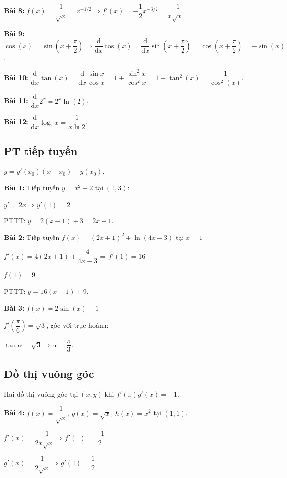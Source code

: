 \documentclass[12pt,a4paper]{article}
\begin{document}
\textbf{Bài 8:} $f(x) = \dfrac{1}{\sqrt{x}} = x^{-1/2} \Rightarrow f'(x) = -\dfrac{1}{2}x^{-3/2} = \dfrac{-1}{x\sqrt{x}}$.

\textbf{Bài 9:} $\cos(x) = \sin(x+\dfrac{\pi}{2}) \Rightarrow \dfrac{\mathrm{d}}{\mathrm{d}x}\cos(x) = \dfrac{\mathrm{d}}{\mathrm{d}x}\sin(x+\dfrac{\pi}{2}) = \cos(x+\dfrac{\pi}{2}) = -\sin(x)$.

\textbf{Bài 10:} $\dfrac{\mathrm{d}}{\mathrm{d}x}\tan(x) = \dfrac{\mathrm{d}}{\mathrm{d}x}\dfrac{\sin x}{\cos x} = 1 + \dfrac{\sin^2x}{\cos^2 x} = 1+\tan^2(x) = \dfrac{1}{\cos^2(x)}$.

\textbf{Bài 11:} $\dfrac{\mathrm{d}}{\mathrm{d}x}2^x = 2^x\ln(2)$.

\textbf{Bài 12:} $\dfrac{\mathrm{d}}{\mathrm{d}x}\log_2{x} = \dfrac{1}{x\ln{2}}$.

\subsection{PT tiếp tuyến}

$y = y'(x_0)(x - x_0) + y(x_0)$.

\textbf{Bài 1:} Tiếp tuyến $y=x^2+2$ tại $(1,3)$:

$y'=2x \Rightarrow y'(1) = 2$

PTTT: $y = 2(x-1)+3 = 2x+1$.

\textbf{Bài 2:} Tiếp tuyến $f(x)=(2x+1)^2+\ln(4x-3)$ tại $x=1$

$f'(x) = 4(2x + 1) + \dfrac{4}{4x - 3} \Rightarrow f'(1)=16$

$f(1) = 9$

PTTT: $y = 16(x-1)+9$.

\textbf{Bài 3:} $f(x) = 2\sin(x)-1$

$f'(\dfrac{\pi}{6})=\sqrt{3}$, góc với trục hoành:

$\tan \alpha = \sqrt{3} \Rightarrow \alpha = \dfrac{\pi}{3}$.

\subsection{Đồ thị vuông góc}

Hai đồ thị vuông góc tại $(x,y)$ khi $f'(x)g'(x)=-1$.

\textbf{Bài 4:} $f(x) = \dfrac{1}{\sqrt{x}}$, $g(x) = \sqrt{x}$, $h(x) = x^2$ tại $(1,1)$.

$f'(x) = \dfrac{-1}{2x\sqrt{x}} \Rightarrow f'(1)=\dfrac{-1}{2}$

$g'(x) = \dfrac{1}{2\sqrt{x}} \Rightarrow g'(1)=\dfrac{1}{2}$
\end{document}

